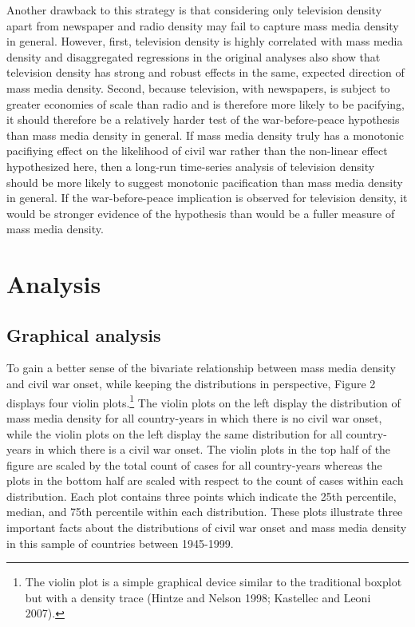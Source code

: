 \documentclass[11pt,article,oneside]{memoir}
\begin{document}
Another drawback to this strategy is that considering only television
density apart from newspaper and radio density may fail to capture mass
media density in general. However, first, television density is highly
correlated with mass media density and disaggregated regressions in the
original analyses also show that television density has strong and
robust effects in the same, expected direction of mass media density.
Second, because television, with newspapers, is subject to greater
economies of scale than radio and is therefore more likely to be
pacifying, it should therefore be a relatively harder test of the
war-before-peace hypothesis than mass media density in general. If mass
media density truly has a monotonic pacifiying effect on the likelihood
of civil war rather than the non-linear effect hypothesized here, then a
long-run time-series analysis of television density should be more
likely to suggest monotonic pacification than mass media density in
general. If the war-before-peace implication is observed for television
density, it would be stronger evidence of the hypothesis than would be a
fuller measure of mass media density.

\section{Analysis}\label{analysis}

\subsection{Graphical analysis}\label{graphical-analysis}

To gain a better sense of the bivariate relationship between mass media
density and civil war onset, while keeping the distributions in
perspective, Figure 2 displays four violin plots.\footnote{The violin
  plot is a simple graphical device similar to the traditional boxplot
  but with a density trace (Hintze and Nelson 1998; Kastellec and Leoni
  2007).} The violin plots on the left display the distribution of mass
media density for all country-years in which there is no civil war
onset, while the violin plots on the left display the same distribution
for all country-years in which there is a civil war onset. The violin
plots in the top half of the figure are scaled by the total count of
cases for all country-years whereas the plots in the bottom half are
scaled with respect to the count of cases within each distribution. Each
plot contains three points which indicate the 25th percentile, median,
and 75th percentile within each distribution. These plots illustrate
three important facts about the distributions of civil war onset and
mass media density in this sample of countries between 1945-1999.
\end{document}
